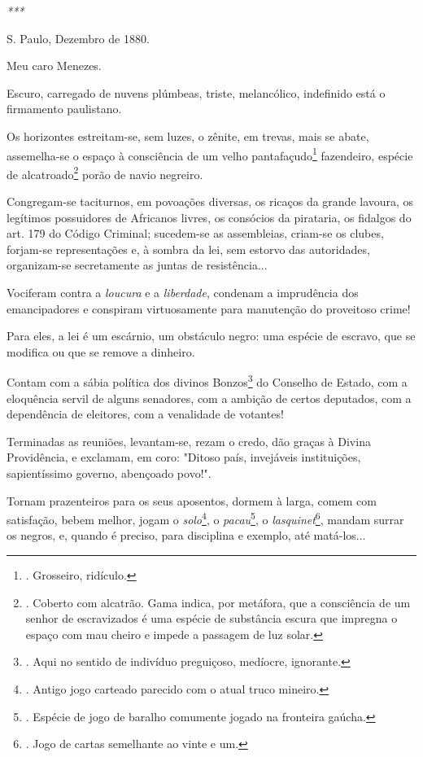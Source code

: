 \emph{***}

S. Paulo, Dezembro de 1880.

Meu caro Menezes.

Escuro, carregado de nuvens plúmbeas, triste, melancólico, indefinido
está o firmamento paulistano.

Os horizontes estreitam-se, sem luzes, o zênite, em trevas, mais se
abate, assemelha-se o espaço à consciência de um velho
pantafaçudo\footnote{. Grosseiro, ridículo.} fazendeiro, espécie de
alcatroado\footnote{. Coberto com alcatrão. Gama indica, por metáfora,
  que a consciência de um senhor de escravizados é uma espécie de
  substância escura que impregna o espaço com mau cheiro e impede a
  passagem de luz solar.} porão de navio negreiro.

Congregam-se taciturnos, em povoações diversas, os ricaços da grande
lavoura, os legítimos possuidores de Africanos livres, os consócios da
pirataria, os fidalgos do art. 179 do Código Criminal; sucedem-se as
assembleias, criam-se os clubes, forjam-se representações e, à sombra da
lei, sem estorvo das autoridades, organizam-se secretamente as juntas de
resistência...

Vociferam contra a \emph{loucura} e a \emph{liberdade}, condenam a
imprudência dos emancipadores e conspiram virtuosamente para manutenção
do proveitoso crime!

Para eles, a lei é um escárnio, um obstáculo negro: uma espécie de
escravo, que se modifica ou que se remove a dinheiro.

Contam com a sábia política dos divinos Bonzos\footnote{. Aqui no
  sentido de indivíduo preguiçoso, medíocre, ignorante.} do Conselho de
Estado, com a eloquência servil de alguns senadores, com a ambição de
certos deputados, com a dependência de eleitores, com a venalidade de
votantes!

Terminadas as reuniões, levantam-se, rezam o credo, dão graças à Divina
Providência, e exclamam, em coro: "Ditoso país, invejáveis instituições,
sapientíssimo governo, abençoado povo!".

Tornam prazenteiros para os seus aposentos, dormem à larga, comem com
satisfação, bebem melhor, jogam o \emph{solo}\footnote{. Antigo jogo
  carteado parecido com o atual truco mineiro.}, o
\emph{pacau}\footnote{. Espécie de jogo de baralho comumente jogado na
  fronteira gaúcha.}, o \emph{lasquinet}\footnote{. Jogo de cartas
  semelhante ao vinte e um.}, mandam surrar os negros, e, quando é
preciso, para disciplina e exemplo, até matá-los...

